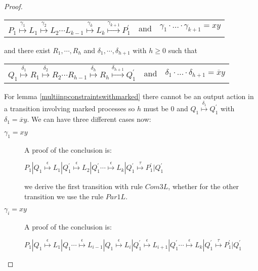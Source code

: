 \begin{proposition}
\begin{proof}
\begin{description}
	\begin{center}
	  \begin{tabular}{lll}
	    $P_{1} \stackrel{\gamma_{1}}{\longmapsto} L_{1}  \stackrel{\gamma_{2}}{\longmapsto} L_{2} \cdots L_{k-1} \stackrel{\gamma_{k}}{\longmapsto} L_{k} \stackrel{\gamma_{k+1}}{\longmapsto} P_{1}^{'}$ 
	  &
	    and
	  &
	    $\gamma_{1} \cdot \ldots \cdot \gamma_{k+1} = xy$
	  \end{tabular}
	\end{center}
	and there exist $R_{1}, \cdots, R_{h}$ and $\delta_{1}, \cdots, \delta_{h+1}$ with $h\geq 0$ such that 
	\begin{center}
	  \begin{tabular}{lll}
	    $Q_{1} \stackrel{\delta_{1}}{\longmapsto} R_{1}  \stackrel{\delta_{2}}{\longmapsto} R_{2} \cdots R_{h-1} \stackrel{\delta_{h}}{\longmapsto} R_{h} \stackrel{\delta_{h+1}}{\longmapsto} Q_{1}^{'}$ 
	  &
	    and
	  &
	    $\delta_{1} \cdot \ldots \cdot \delta_{h+1} = \overline{x}y$
	  \end{tabular}
	\end{center}
	For lemma \ref{multiinpconstraintswithmarked} there cannot be an output action in a transition involving marked processes so $h$ must be $0$ and $Q_{1} \stackrel{\delta_{1}}{\longmapsto} Q_{1}^{'}$ with $\delta_{1}=\overline{x}y$. We can have three different cases now: 
	\begin{description}
	  \item[$\gamma_{1}=xy$]
	    A proof of the conclusion is:
	    \begin{center}
	      $P_{1}|Q_{1} \stackrel{\epsilon}{\longmapsto} L_{1}|Q_{1}^{'}
			      \stackrel{\epsilon}{\longmapsto} L_{2}|Q_{1}^{'}
		  \cdots
				\stackrel{\epsilon}{\longmapsto} L_{k}|Q_{1}^{'}
				\stackrel{\tau}{\longmapsto} P_{1}^{'}|Q_{1}^{'}$	  
	    \end{center}
	    we derive the first transition with rule $Com3L$, whether for the other transition we use the rule $Par1L$.
	  \item[$\gamma_{i}=xy$]
	    A proof of the conclusion is:
	    \begin{center}
	      $
		  P_{1}|Q_{1} \stackrel{\epsilon}{\longmapsto} L_{1}|Q_{1} 
		  \cdots
			      \stackrel{\epsilon}{\longmapsto} L_{i-1}|Q_{1} 
			      \stackrel{\epsilon}{\longmapsto} L_{i}|Q_{1}^{'}
			      \stackrel{\epsilon}{\longmapsto} L_{i+1}|Q_{1}^{'}
		  \cdots 
			      \stackrel{\epsilon}{\longmapsto} L_{k}|Q_{1}^{'}
			      \stackrel{\tau}{\longmapsto} P_{1}^{'}|Q_{1}^{'}$	  
	    \end{center}

\end{description}
\end{description}
\end{proof}
\end{proposition}
